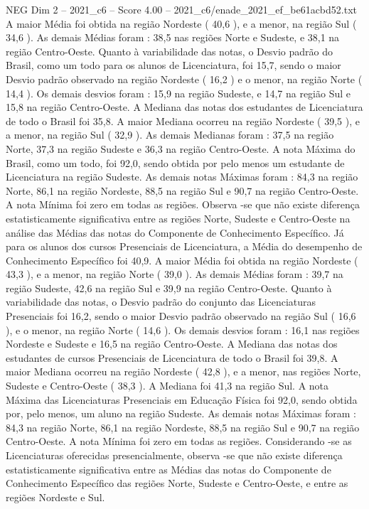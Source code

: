 \begin{textsample}{NEG Dim 2 – 2021\_c6 – Score 4.00 – 2021\_c6/enade\_2021\_ef\_be61acbd52.txt}
A maior Média foi obtida na região Nordeste ( 40,6 ), e a menor, na região Sul ( 34,6 ).
As demais Médias foram : 38,5 nas regiões Norte e Sudeste, e 38,1 na região Centro-Oeste.
Quanto à variabilidade das notas, o Desvio padrão do Brasil, como um todo para os alunos de Licenciatura, foi 15,7, sendo o maior Desvio padrão observado na região Nordeste ( 16,2 ) e o menor, na região Norte ( 14,4 ).
Os demais desvios foram : 15,9 na região Sudeste, e 14,7 na região Sul e 15,8 na região Centro-Oeste.
A Mediana das notas dos estudantes de Licenciatura de todo o Brasil foi 35,8.
A maior Mediana ocorreu na região Nordeste ( 39,5 ), e a menor, na região Sul ( 32,9 ).
As demais Medianas foram : 37,5 na região Norte, 37,3 na região Sudeste e 36,3 na região Centro-Oeste.
A nota Máxima do Brasil, como um todo, foi 92,0, sendo obtida por pelo menos um estudante de Licenciatura na região Sudeste.
As demais notas Máximas foram : 84,3 na região Norte, 86,1 na região Nordeste, 88,5 na região Sul e 90,7 na região Centro-Oeste.
A nota Mínima foi zero em todas as regiões.
Observa -se que não existe diferença estatisticamente significativa entre as regiões Norte, Sudeste e Centro-Oeste na análise das Médias das notas do Componente de Conhecimento Específico.
Já para os alunos dos cursos Presenciais de Licenciatura, a Média do desempenho de Conhecimento Específico foi 40,9.
A maior Média foi obtida na região Nordeste ( 43,3 ), e a menor, na região Norte ( 39,0 ).
As demais Médias foram : 39,7 na região Sudeste, 42,6 na região Sul e 39,9 na região Centro-Oeste.
Quanto à variabilidade das notas, o Desvio padrão do conjunto das Licenciaturas Presenciais foi 16,2, sendo o maior Desvio padrão observado na região Sul ( 16,6 ), e o menor, na região Norte ( 14,6 ).
Os demais desvios foram : 16,1 nas regiões Nordeste e Sudeste e 16,5 na região Centro-Oeste.
A Mediana das notas dos estudantes de cursos Presenciais de Licenciatura de todo o Brasil foi 39,8.
A maior Mediana ocorreu na região Nordeste ( 42,8 ), e a menor, nas regiões Norte, Sudeste e Centro-Oeste ( 38,3 ).
A Mediana foi 41,3 na região Sul.
A nota Máxima das Licenciaturas Presenciais em Educação Física foi 92,0, sendo obtida por, pelo menos, um aluno na região Sudeste.
As demais notas Máximas foram : 84,3 na região Norte, 86,1 na região Nordeste, 88,5 na região Sul e 90,7 na região Centro-Oeste.
A nota Mínima foi zero em todas as regiões.
Considerando -se as Licenciaturas oferecidas presencialmente, observa -se que não existe diferença estatisticamente significativa entre as Médias das notas do Componente de Conhecimento Específico das regiões Norte, Sudeste e Centro-Oeste, e entre as regiões Nordeste e Sul.

\end{textsample}
